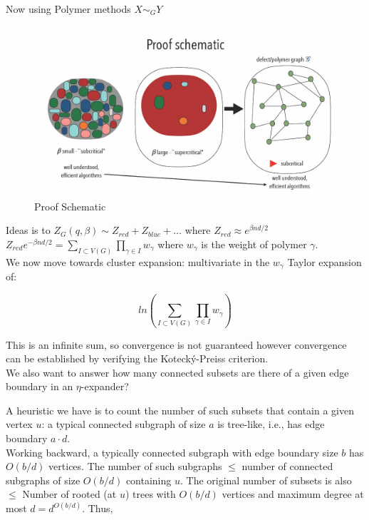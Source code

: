 \documentclass{article}
\begin{document}
\noindent Now using Polymer methods $X \sim _GY$

\begin{figure}[h]
\centering
\includegraphics[width=\textwidth]{media/proof-schematic.jpg}
\caption{Proof Schematic}
\label{fig:proof-schematic}
\end{figure}

\noindent Ideas is to $Z_G(q,\beta) \sim Z_{red} + Z_{blue}+\dots$ where $Z_{red} \approx e^{\beta nd/2}$\\

\noindent $Z_{red} e^{-\beta nd/2} = \sum_{I \subset V(G)} \prod_{\gamma \in I}w_{\gamma}$ where $w_{\gamma}$ is the weight of polymer $\gamma$.\\

We now move towards cluster expansion: multivariate in the $w_{\gamma}$ Taylor expansion of:

\begin{equation*}
    ln(\sum_{I \subset V(G)} \prod_{\gamma \in I}w_{\gamma})
\end{equation*}

\noindent This is an infinite sum, so convergence is not guaranteed however convergence can be established by verifying the Kotecký-Preiss criterion.\\

\noindent We also want to answer how many connected subsets are there of a given edge boundary in an $\eta$-expander?

\noindent A heuristic we have is to count the number of such subsets that contain a given vertex $u$: a typical connected subgraph of size $a$ is tree-like, i.e., has edge boundary $a \cdot d$.\\

\noindent Working backward, a typically connected subgraph with edge boundary size $b$ has $O(b/d)$ vertices. The number of such subgraphs $\leq$ number of connected subgraphs of size $O(b/d)$ containing $u$. The original number of subsets is also $\leq$ Number of rooted (at $u$) trees with $O(b/d)$ vertices and maximum degree at most $d = d^{O(b/d)}$. Thus,
\end{document}
